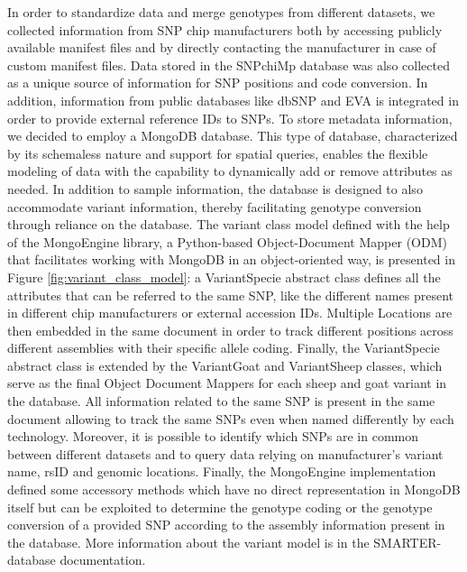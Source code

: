 \documentclass[a4paper,num-refs,gigabyte]{oup-contemporary}
\begin{document}
In order to standardize data and merge genotypes from different datasets, we collected information from SNP chip manufacturers both by accessing publicly available manifest files and by directly contacting the manufacturer in case of custom manifest files. Data stored in the SNPchiMp database\citep{Nicolazzi2015b} was also collected as a unique source of information for SNP positions and code conversion. In addition, information from public databases like dbSNP\citep{Sherry1999} and EVA\citep{Cezard2022} is integrated in order to provide external reference IDs to SNPs.
To store metadata information, we decided  to employ a MongoDB\citep{MongoDBURL} database. This type of database, characterized by its schemaless nature and support for spatial queries, enables the flexible modeling of data with the capability to dynamically add or remove attributes as needed. In addition to sample information, the database is designed to also accommodate variant information, thereby facilitating genotype conversion through reliance on the database. The variant class model defined with the help of the MongoEngine\citep{MongoEngine} library, a Python-based Object-Document Mapper (ODM)\citep{ODBvsORM} that facilitates working with MongoDB in an object-oriented way, is presented in Figure \ref{fig:variant_class_model}: a VariantSpecie abstract class defines all the attributes that can be referred to the same SNP, like the different names present in different chip manufacturers or external accession IDs. Multiple Locations are then embedded in the same document in order to track different positions across different assemblies with their specific allele coding. Finally, the VariantSpecie abstract class is extended by the VariantGoat and VariantSheep classes, which serve as the final Object Document Mappers\citep{ODBvsORM} for each sheep and goat variant in the database. All information related to the same SNP is present in the same document allowing to track the same SNPs even when named differently by each technology. Moreover, it is possible to identify which SNPs are in common between different datasets and to query data relying on manufacturer's variant name, rsID and genomic locations. Finally, the MongoEngine\citep{MongoEngine} implementation defined some accessory methods which have no direct representation in MongoDB itself but can be exploited to determine the genotype coding or the genotype conversion of a provided SNP according to the assembly information present in the database. More information about the variant model is in the SMARTER-database documentation\citep{SMARTERdocs}.
\end{document}
